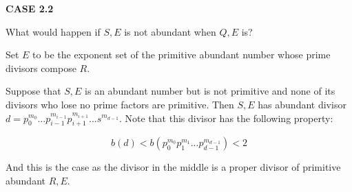 \documentclass[../paper.tex]{subfiles}
\begin{document}
\textbf{CASE 2.2}


What would happen if $S,E$ is not abundant when $Q,E$ is?

Set $E$ to be the exponent set of the primitive abundant number
whose prime divisors compose $R$.

Suppose that $S,E$ is an abundant number but is not primitive and
none of its divisors who lose no prime factors are primitive. Then
$S,E$ has abundant divisor $d = p_0^{m_0} ... p_{i-1}^{m_{i-1}}
p_{i+1}^{m_{i+1}} ... s^{m_{d-1}}$. Note that this divisor has the
following property:

$$b(d) < b(p_0^{m_0} p_1^{m_1} ... p_{d-1}^{m_{d-1}}) < 2$$

And this is the case as the divisor in the middle is a proper
divisor of primitive abundant $R,E$.


\end{document}

